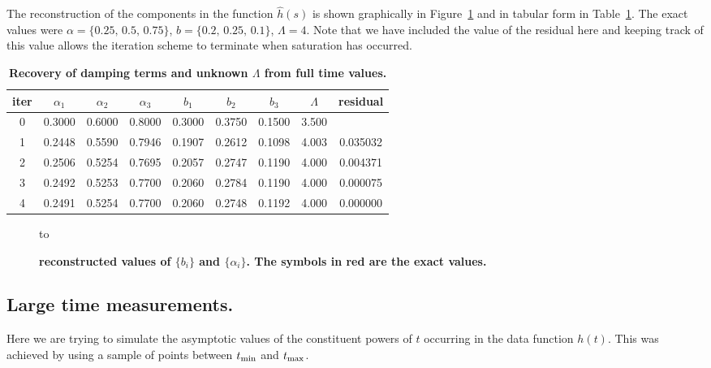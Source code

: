 The reconstruction of the components in the function $\hat{h}(s)$ is shown
graphically in Figure~\ref{fig:b_and_alpha} and in tabular form in 
Table~\ref{Table:Full_time_trace}.
The exact values were $\alpha=\{0.25, \, 0.5, \, 0.75\}$, $b=\{0.2,\,0.25,\,0.1\}$, $\Lambda=4$. %
Note that we have included the value of the residual here and keeping track of
this value allows the iteration scheme to terminate when saturation has
occurred.
\begin{table}[H]
\centering
\small
\footnotesize
\begin{tabular}{|c|c|c|c|c|c|c|c|c|}
\hline
iter & $\alpha_1$ & $\alpha_2$ & $\alpha_3$ & $b_1$ & $b_2$ & $b_3$ & $\Lambda$ & residual\\
\hline
	0 & 0.3000 & 0.6000 & 0.8000 & 0.3000 & 0.3750 & 0.1500 & 3.500 & {} \\
1 & 0.2448 & 0.5590 & 0.7946 & 0.1907 & 0.2612 & 0.1098 & 4.003 & 0.035032 \\
2 & 0.2506 & 0.5254 & 0.7695 & 0.2057 & 0.2747 & 0.1190 & 4.000 & 0.004371 \\
3 & 0.2492 & 0.5253 & 0.7700 & 0.2060 & 0.2784 & 0.1190 & 4.000 & 0.000075 \\
4 & 0.2491 & 0.5254 & 0.7700 & 0.2060 & 0.2748 & 0.1192 & 4.000 & 0.000000 \\
\hline
\end{tabular}
\small
\footnotesize
\caption{\bf Recovery of  damping terms and unknown $\Lambda$ from full time values.}
 \label{Table:Full_time_trace}
\end{table}
\begin{figure}[h]
\small
\hbox to \hsize{\hfill\copy\figurefour\hfill\copy\figurethree\hfill}
\caption{\small {\bf reconstructed values of $\{b_i\}$ and $\{\alpha_i\}$.
The symbols in red are the exact values.}}
\label{fig:b_and_alpha}
\end{figure}



\subsection{Large time measurements.}

Here we are trying to simulate the asymptotic values of the constituent
powers of $t$ occurring in the data function $h(t)$.
This was achieved by using a sample of points between $t_{\rm min}$
and $t_{\rm max}$.

